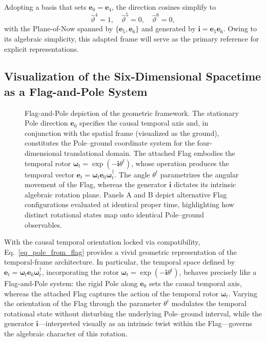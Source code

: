 Adopting a basis that sets $\mathbf{e}_{0} = \mathbf{e}_{4}$, the direction cosines simplify to
\begin{equation}
    \hat{\vartheta}^{4} = 1, \quad \hat{\vartheta}^{5} = 0, \quad \hat{\vartheta}^{6} = 0,
\end{equation}
with the Plane-of-Now spanned by $\{\mathbf{e}_{5}, \mathbf{e}_{6}\}$ and generated by $\mathbf{i} = \mathbf{e}_{5}\mathbf{e}_{6}$. Owing to its algebraic simplicity, this adapted frame will serve as the primary reference for explicit representations.

\subsection{Visualization of the Six-Dimensional Spacetime as a Flag-and-Pole System}
\label{ch_flag_pole_visualization}

\begin{figure}[htbp]
\centering

\caption{Flag-and-Pole depiction of the geometric framework. The stationary Pole direction $\mathbf{e}_{0}$ specifies the causal temporal axis and, in conjunction with the spatial frame (visualized as the ground), constitutes the Pole--ground coordinate system for the four-dimensional translational domain. The attached Flag embodies the temporal rotor $\boldsymbol{\omega}_{t}=\exp(-\mathbf{i}\theta^{t})$, whose operation produces the temporal vector $\mathbf{e}_{t}=\boldsymbol{\omega}_{t}\mathbf{e}_{0}\boldsymbol{\omega}_{t}^{\dagger}$. The angle $\theta^{t}$ parametrizes the angular movement of the Flag, whereas the generator $\mathbf{i}$ dictates its intrinsic algebraic rotation plane. Panels A and B depict alternative Flag configurations evaluated at identical proper time, highlighting how distinct rotational states map onto identical Pole--ground observables.}
\label{fig-FlagAndPoleDiag}
\end{figure}

With the causal temporal orientation locked via compatibility, Eq.~\eqref{eq_pole_from_flag} provides a vivid geometric representation of the temporal-frame architecture. In particular, the temporal space defined by $\mathbf{e}_{t}=\boldsymbol{\omega}_{t}\mathbf{e}_{0}\boldsymbol{\omega}_{t}^{\dagger}$, incorporating the rotor $\boldsymbol{\omega}_{t}=\exp(-\mathbf{i}\theta^{t})$, behaves precisely like a Flag-and-Pole system: the rigid Pole along $\mathbf{e}_{0}$ sets the causal temporal axis, whereas the attached Flag captures the action of the temporal rotor $\boldsymbol{\omega}_{t}$. Varying the orientation of the Flag through the parameter $\theta^{t}$ modulates the temporal rotational state without disturbing the underlying Pole--ground interval, while the generator $\mathbf{i}$—interpreted visually as an intrinsic twist within the Flag—governs the algebraic character of this rotation.

